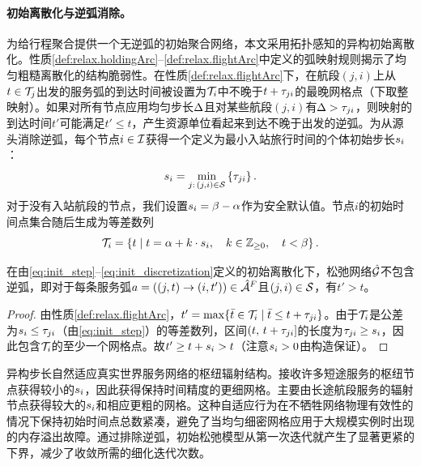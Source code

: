 \paragraph{初始离散化与逆弧消除。}
为给行程聚合提供一个无逆弧的初始聚合网络，本文采用拓扑感知的异构初始离散化。性质\ref{def:relax.holdingArc}--\ref{def:relax.flightArc}中定义的弧映射规则揭示了均匀粗糙离散化的结构脆弱性。在性质\ref{def:relax.flightArc}下，在航段$(j,i)$上从$t \in \mathcal{T}_j$出发的服务弧的到达时间被设置为$\mathcal{T}_i$中不晚于$t + \tau_{ji}$的最晚网格点（下取整映射）。如果对所有节点应用均匀步长$\Delta$且对某些航段$(j,i)$有$\Delta > \tau_{ji}$，则映射的到达时间$t'$可能满足$t' \le t$，产生资源单位看起来到达不晚于出发的逆弧。为从源头消除逆弧，每个节点$i \in \mathcal{I}$获得一个定义为最小入站旅行时间的个体初始步长$s_i$：
\begin{equation}\label{eq:init_step}
    s_i = \min_{j:\,(j,i)\in\mathcal{S}} \left\{ \tau_{ji} \right\}.
\end{equation}
对于没有入站航段的节点，我们设置$s_i = \beta - \alpha$作为安全默认值。节点$i$的初始时间点集合随后生成为等差数列
\begin{equation}\label{eq:init_discretization}
    \mathcal{T}_i = \left\{ t \;\middle|\; t = \alpha + k \cdot s_i,\quad k \in \mathbb{Z}_{\ge 0},\quad t < \beta \right\}.
\end{equation}

\begin{proposition}[消除逆弧]\label{prop:no_inverse}
    在由\eqref{eq:init_step}--\eqref{eq:init_discretization}定义的初始离散化下，松弛网络$\hat{\mathcal{G}}$不包含逆弧，即对于每条服务弧$a = ((j,t) \to (i,t')) \in {\hat{\mathcal{A}}^F_{{}}}$且$(j,i) \in \mathcal{S}$，有$t' > t$。
\end{proposition}
\begin{proof}
    由性质\ref{def:relax.flightArc}，$t' = \max\{\bar{t} \in \mathcal{T}_i \mid \bar{t} \le t + \tau_{ji}\}$。由于$\mathcal{T}_i$是公差为$s_i \le \tau_{ji}$（由\eqref{eq:init_step}）的等差数列，区间$(t,\, t + \tau_{ji}]$的长度为$\tau_{ji} \ge s_i$，因此包含$\mathcal{T}_i$的至少一个网格点。故$t' \ge t + s_i > t$（注意$s_i > 0$由构造保证）。
\end{proof}

异构步长自然适应真实世界服务网络的枢纽辐射结构。接收许多短途服务的枢纽节点获得较小的$s_i$，因此获得保持时间精度的更细网格。主要由长途航段服务的辐射节点获得较大的$s_i$和相应更粗的网格。这种自适应行为在不牺牲网络物理有效性的情况下保持初始时间点总数紧凑，避免了当均匀细密网格应用于大规模实例时出现的内存溢出故障。通过排除逆弧，初始松弛模型从第一次迭代就产生了显著更紧的下界，减少了收敛所需的细化迭代次数。
